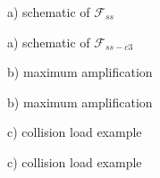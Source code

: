 \documentclass[a4paper,10pt]{article}
\begin{document}
\sffamily 


\begin{center}
a) schematic of $\mathcal{F}_{ss}$
\end{center}

\begin{center}
a) schematic of $\mathcal{F}_{ss-c3}$
\end{center}

\begin{center}
b) maximum amplification
\end{center}

\begin{center}
b) maximum amplification
\end{center}

\begin{center}
c) collision load example
\end{center}

\begin{center}
c) collision load example
\end{center}



%
%
\end{document}
